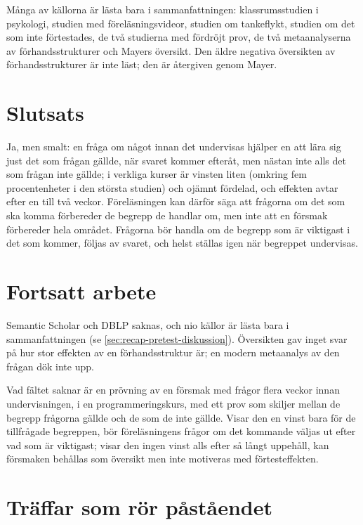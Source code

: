 Många av källorna är lästa bara i sammanfattningen: klassrumsstudien i
psykologi, studien med föreläsningsvideor, studien om tankeflykt,
studien om det som inte förtestades, de två studierna med fördröjt prov,
de två metaanalyserna av förhandsstrukturer och Mayers översikt.  Den äldre
negativa översikten av förhandsstrukturer är inte läst; den är återgiven
genom Mayer.

\section{Slutsats}
\label{sec:recap-pretest-slutsats}

Ja, men smalt: en fråga om något innan det undervisas hjälper en att
lära sig just det som frågan gällde, när svaret kommer efteråt, men
nästan inte alls det som frågan inte gällde; i verkliga kurser är
vinsten liten (omkring fem procentenheter i den största studien) och
ojämnt fördelad, och effekten avtar
efter en till två veckor.  Föreläsningen kan därför säga att frågorna om
det som ska komma förbereder de begrepp de handlar om, men inte att en
försmak förbereder hela området.  Frågorna bör handla om de begrepp som
är viktigast i det som kommer, följas av svaret, och helst ställas igen
när begreppet undervisas.

\section{Fortsatt arbete}
\label{sec:recap-pretest-fortsatt}

Semantic Scholar och DBLP saknas, och nio källor är lästa bara i
sammanfattningen (se \cref{sec:recap-pretest-diskussion}).  Översikten
gav inget svar på hur stor effekten av en förhandsstruktur är; en
modern metaanalys av den frågan dök inte upp.

Vad fältet saknar är en prövning av en försmak med frågor flera veckor
innan undervisningen, i en programmeringskurs, med ett prov som skiljer
mellan de begrepp frågorna gällde och de som de inte gällde.  Visar den
en vinst bara för de tillfrågade begreppen, bör föreläsningens frågor om
det kommande väljas ut efter vad som är viktigast; visar den ingen vinst
alls efter så långt uppehåll, kan försmaken behållas som översikt men
inte motiveras med förtesteffekten.

\section{Träffar som rör påståendet}

